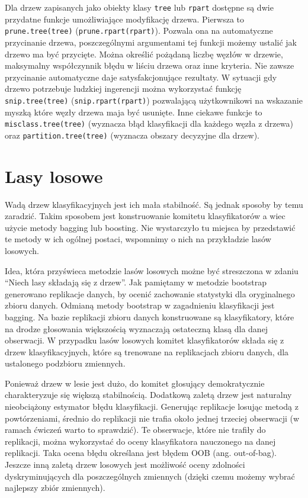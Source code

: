 \documentclass[polish,]{book}
\begin{document}
Dla drzew zapisanych jako obiekty klasy \texttt{tree} lub \texttt{rpart} dostępne są dwie przydatne funkcje umożliwiające modyfikację drzewa. Pierwsza to \texttt{prune.tree(tree)}
(\texttt{prune.rpart(rpart)}). Pozwala ona na automatyczne przycinanie drzewa, poszczególnymi argumentami tej funkcji możemy ustalić jak drzewo ma być przycięte. Można określić pożądaną liczbę węzłów w drzewie, maksymalny współczynnik błędu
w liściu drzewa oraz inne kryteria. Nie zawsze przycinanie automatyczne daje satysfakcjonujące rezultaty. W sytuacji gdy drzewo potrzebuje ludzkiej ingerencji można wykorzystać funkcję \texttt{snip.tree(tree)} (\texttt{snip.rpart(rpart)}) pozwalającą użytkownikowi na wskazanie myszką które węzły drzewa maja być usunięte. Inne ciekawe funkcje to \texttt{misclass.tree(tree)} (wyznacza błąd klasyfikacji dla każdego węzła z drzewa) oraz \texttt{partition.tree(tree)} (wyznacza obszary decyzyjne dla drzew).

\hypertarget{part_45}{%
\section{Lasy losowe}\label{part_45}}

Wadą drzew klasyfikacyjnych jest ich mała stabilność. Są jednak sposoby by temu
zaradzić. Takim sposobem jest konstruowanie komitetu klasyfikatorów a wiec użycie
metody bagging lub boosting. Nie wystarczyło tu miejsca by przedstawić te metody
w ich ogólnej postaci, wspomnimy o nich na przykładzie lasów losowych.

Idea, która przyświeca metodzie lasów losowych możne być streszczona w zdaniu
``Niech lasy składają się z drzew''. Jak pamiętamy w metodzie bootstrap generowano
replikacje danych, by ocenić zachowanie statystyki dla oryginalnego zbioru danych.
Odmianą metody bootstrap w zagadnieniu klasyfikacji jest bagging. Na bazie replikacji zbioru danych konstruowane są klasyfikatory, które na drodze głosowania
większością wyznaczają ostateczną klasą dla danej obserwacji. W przypadku lasów
losowych komitet klasyfikatorów składa się z drzew klasyfikacyjnych, które są trenowane na replikacjach zbioru danych, dla ustalonego podzbioru zmiennych.

Ponieważ drzew w lesie jest dużo, do komitet głosujący demokratycznie charakteryzuje się większą stabilnością. Dodatkową zaletą drzew jest naturalny nieobciążony
estymator błędu klasyfikacji. Generując replikacje losując metodą z powtórzeniami,
średnio do replikacji nie trafia około jednej trzeciej obserwacji (w ramach ćwiczeń
warto to sprawdzić). Te obserwacje, które nie trafiły do replikacji, można wykorzystać do oceny klasyfikatora nauczonego na danej replikacji. Taka ocena błędu określana jest błędem OOB (ang. out-of-bag). Jeszcze inną zaletą drzew losowych jest
możliwość oceny zdolności dyskryminujących dla poszczególnych zmiennych (dzięki
czemu możemy wybrać najlepszy zbiór zmiennych).
\end{document}
